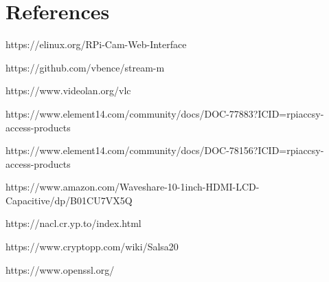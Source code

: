 \documentclass[onecolumn, draftclsnofoot,10pt, compsoc]{IEEEtran}
\begin{document}
\section{References}
\begin{list}{•}{•}

\item https://elinux.org/RPi-Cam-Web-Interface
\item https://github.com/vbence/stream-m
\item https://www.videolan.org/vlc
\item https://www.element14.com/community/docs/DOC-77883?ICID=rpiaccsy-access-products
\item https://www.element14.com/community/docs/DOC-78156?ICID=rpiaccsy-access-products
\item https://www.amazon.com/Waveshare-10-1inch-HDMI-LCD-Capacitive/dp/B01CU7VX5Q
\item https://nacl.cr.yp.to/index.html
\item https://www.cryptopp.com/wiki/Salsa20
\item https://www.openssl.org/
\end{list}
\end{document}
